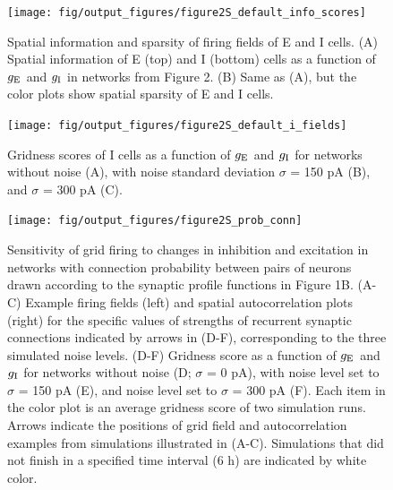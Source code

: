 \documentclass[a4paper,12pt]{article}
\newcommand{\ssc}[3]{\ensuremath{#1_{\text{#2}_{\text{#3}}}}}
\newcommand{\gE      }{\ssc{g}      {\scriptsize{E}}{}}
\newcommand{\gI      }{\ssc{g}      {\scriptsize{I}}{}}
\begin{document}
\clearpage

\begin{figure}[p]
    \internallinenumbers
    \centering
        \texttt{[image: fig/output\_figures/figure2S\_default\_info\_scores]}
\end{figure}

\clearpage

\begin{figure}[H]
    \internallinenumbers
    \caption{Spatial information and sparsity of firing fields of E and I
    cells. (A) Spatial information of E (top) and I (bottom) cells as a
    function of $\gE$ and $\gI$ in networks from Figure 2. (B) Same as (A), but
    the color plots show spatial sparsity of E and I cells.}
\end{figure}

\clearpage

\begin{figure}[p]
    \internallinenumbers
    \centering
        \texttt{[image: fig/output\_figures/figure2S\_default\_i\_fields]}
    \caption{Gridness scores of I cells as a function of $\gE$ and $\gI$ for
    networks without noise (A), with noise standard deviation $\sigma$ = 150
    pA (B), and $\sigma$ = 300 pA (C).}
\end{figure}

\clearpage

\begin{figure}[p]
    \internallinenumbers
    \centering
        \texttt{[image: fig/output\_figures/figure2S\_prob\_conn]}
    \caption{Sensitivity of grid firing to changes in inhibition and excitation
    in networks with connection probability between pairs of neurons drawn
    according to the synaptic profile functions in Figure 1B. (A-C) Example
    firing fields (left) and spatial autocorrelation plots (right) for the
    specific values of strengths of recurrent synaptic connections indicated by
    arrows in (D-F), corresponding to the three simulated noise levels.  (D-F)
    Gridness score as a function of $\gE$ and $\gI$ for networks without noise (D;
    $\sigma$ = 0 pA), with noise level set to $\sigma$ = 150 pA (E), and noise
    level set to $\sigma$ = 300 pA (F). Each item in the color plot is an
    average gridness score of two simulation runs. Arrows indicate the
    positions of grid field and autocorrelation examples from simulations
    illustrated in (A-C). Simulations that did not finish in a specified time
    interval (6 h) are indicated by white color.}
\end{figure}
\end{document}
